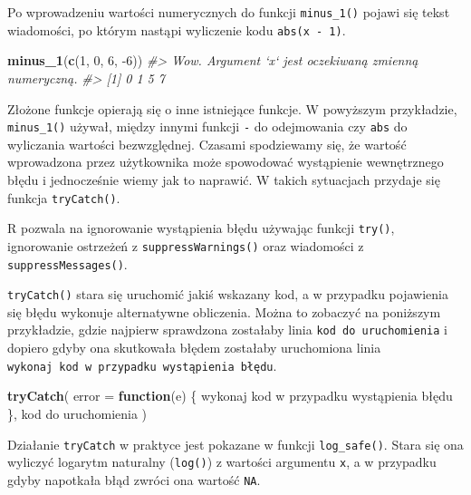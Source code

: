 \documentclass[paper=6in:9in,pagesize=pdftex,headinclude=on,footinclude=on,10pt]{scrbook}
\makeatletter
\newenvironment{Shaded}{\begin{snugshade}}{\end{snugshade}}
\newcommand{\CommentTok}[1]{\textcolor[rgb]{0.56,0.35,0.01}{\textit{#1}}}
\newcommand{\ControlFlowTok}[1]{\textcolor[rgb]{0.13,0.29,0.53}{\textbf{#1}}}
\newcommand{\DataTypeTok}[1]{\textcolor[rgb]{0.13,0.29,0.53}{#1}}
\newcommand{\DecValTok}[1]{\textcolor[rgb]{0.00,0.00,0.81}{#1}}
\newcommand{\KeywordTok}[1]{\textcolor[rgb]{0.13,0.29,0.53}{\textbf{#1}}}
\newcommand{\NormalTok}[1]{#1}
\newenvironment{kframe}{%
\medskip{}
\setlength{\fboxsep}{.8em}
 \def\at@end@of@kframe{}%
 \ifinner\ifhmode%
  \def\at@end@of@kframe{\end{minipage}}%
  \begin{minipage}{\columnwidth}%
 \fi\fi%
 \def\FrameCommand##1{\hskip\@totalleftmargin \hskip-\fboxsep
 \colorbox{shadecolor}{##1}\hskip-\fboxsep
     \hskip-\linewidth \hskip-\@totalleftmargin \hskip\columnwidth}%
 \MakeFramed {\advance\hsize-\width
   \@totalleftmargin\z@ \linewidth\hsize
   \@setminipage}}%
 {\par\unskip\endMakeFramed%
 \at@end@of@kframe}
\newenvironment{rmdblock}[1]
  {
  \begin{itemize}
  \renewcommand{\labelitemi}{
    \raisebox{-.7\height}[0pt][0pt]{
      {\setkeys{Gin}{width=3em,keepaspectratio}\texttt{[image: images/\#1]}}
    }
  }
  \setlength{\fboxsep}{1em}
  \begin{kframe}
  \item
  }
  {
  \end{kframe}
  \end{itemize}
  }
\newenvironment{rmdinfo}
  {\begin{rmdblock}{compass}}
  {\end{rmdblock}}
\makeatother
\begin{document}
Po wprowadzeniu wartości numerycznych do funkcji \texttt{minus\_1()} pojawi się tekst wiadomości, po którym nastąpi wyliczenie kodu \texttt{abs(x\ -\ 1)}.

\begin{Shaded}
\begin{Highlighting}[]
\KeywordTok{minus_1}\NormalTok{(}\KeywordTok{c}\NormalTok{(}\DecValTok{1}\NormalTok{, }\DecValTok{0}\NormalTok{, }\DecValTok{6}\NormalTok{, }\DecValTok{-6}\NormalTok{))}
\CommentTok{#> Wow. Argument `x` jest oczekiwaną zmienną numeryczną.}
\CommentTok{#> [1] 0 1 5 7}
\end{Highlighting}
\end{Shaded}

Złożone funkcje opierają się o inne istniejące funkcje.
W powyższym przykładzie, \texttt{minus\_1()} używał, między innymi funkcji \texttt{-} do odejmowania czy \texttt{abs} do wyliczania wartości bezwzględnej.
Czasami spodziewamy się, że wartość wprowadzona przez użytkownika może spowodować wystąpienie wewnętrznego błędu i jednocześnie wiemy jak to naprawić.
W takich sytuacjach przydaje się funkcja \texttt{tryCatch()}.

\begin{rmdinfo}
R pozwala na ignorowanie wystąpienia błędu używając funkcji \texttt{try()}, ignorowanie ostrzeżeń z \texttt{suppressWarnings()} oraz wiadomości z \texttt{suppressMessages()}.
\end{rmdinfo}

\texttt{tryCatch()} stara się uruchomić jakiś wskazany kod, a w przypadku pojawienia się błędu wykonuje alternatywne obliczenia.
Można to zobaczyć na poniższym przykładzie, gdzie najpierw sprawdzona zostałaby linia \texttt{kod\ do\ uruchomienia} i dopiero gdyby ona skutkowała błędem zostałaby uruchomiona linia \texttt{wykonaj\ kod\ w\ przypadku\ wystąpienia\ błędu}.

\begin{Shaded}
\begin{Highlighting}[]
\KeywordTok{tryCatch}\NormalTok{(}
  \DataTypeTok{error =} \ControlFlowTok{function}\NormalTok{(e) \{}
\NormalTok{    wykonaj kod w przypadku wystąpienia błędu}
\NormalTok{  \},}
\NormalTok{  kod do uruchomienia }
\NormalTok{)}
\end{Highlighting}
\end{Shaded}

Działanie \texttt{tryCatch} w praktyce jest pokazane w funkcji \texttt{log\_safe()}.
Stara się ona wyliczyć logarytm naturalny (\texttt{log()}) z wartości argumentu \texttt{x}, a w przypadku gdyby napotkała błąd zwróci ona wartość \texttt{NA}.
\end{document}
